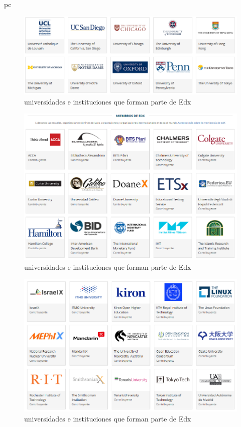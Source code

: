 pc\documentclass[a4paper,12pt,openany]{book}
\begin{document}
\begin{figure}[ht]
  \centering
	\includegraphics[width=12cm]{edx10-4.png}
\caption{universidades e instituciones que forman parte de Edx}
  \label{fig:edx10-4}
\end{figure}

\begin{figure}[ht]
  \centering
	\includegraphics[width=12cm]{edx10-5.png}
\caption{universidades e instituciones que forman parte de Edx}
  \label{fig:edx10-5}
\end{figure}

\begin{figure}[ht]
  \centering
	\includegraphics[width=12cm]{edx10-6.png}
\caption{universidades e instituciones que forman parte de Edx}
  \label{fig:edx10-6}
\end{figure}
\end{document}
